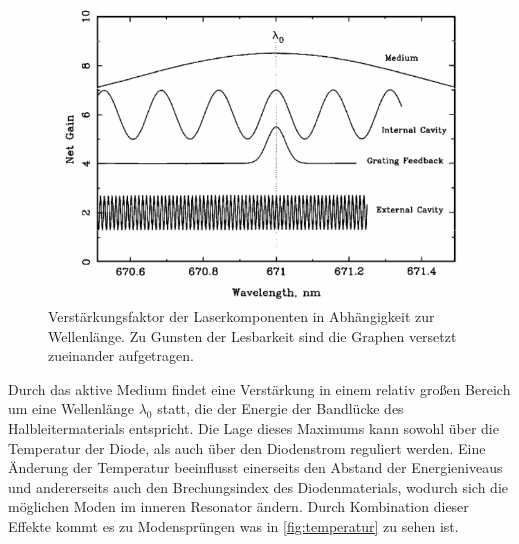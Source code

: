 \begin{figure}
    \centering
    \includegraphics[scale=0.50]{content/pics/net_gain.png}
    \caption{Verstärkungsfaktor der Laserkomponenten in Abhängigkeit zur Wellenlänge. Zu Gunsten der Lesbarkeit sind die Graphen versetzt zueinander 
    aufgetragen. \cite{diode_laser_spectroscopy}}
    \label{fig:net_gain}
\end{figure}

Durch das aktive Medium findet eine Verstärkung in einem relativ großen Bereich um eine Wellenlänge $\lambda_0$ statt, die der Energie der Bandlücke des Halbleitermaterials entspricht. 
Die Lage dieses Maximums kann sowohl über die Temperatur der Diode, als auch über den Diodenstrom reguliert werden. Eine Änderung der Temperatur beeinflusst einerseits 
den Abstand der Energieniveaus und andererseits auch den Brechungsindex des Diodenmaterials, wodurch sich die möglichen Moden im inneren Resonator ändern. 
Durch Kombination dieser Effekte kommt es zu Modensprüngen was in \autoref{fig:temperatur} zu sehen ist. 

